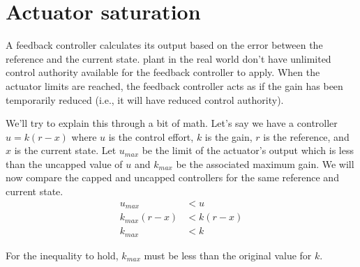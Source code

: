 \section{Actuator saturation}

A feedback controller calculates its output based on the error between the
\gls{reference} and the current \gls{state}. \Gls{plant} in the real world don't
have unlimited control authority available for the feedback controller to apply.
When the actuator limits are reached, the feedback controller acts as if the
gain has been temporarily reduced (i.e., it will have reduced control
authority).

We'll try to explain this through a bit of math. Let's say we have a controller
$u = k(r - x)$ where $u$ is the \gls{control effort}, $k$ is the gain, $r$ is
the \gls{reference}, and $x$ is the current \gls{state}. Let $u_{max}$ be the
limit of the actuator's output which is less than the uncapped value of $u$ and
$k_{max}$ be the associated maximum gain. We will now compare the capped and
uncapped controllers for the same \gls{reference} and current \gls{state}.
\begin{align*}
  u_{max} &< u \\
  k_{max}(r - x) &< k(r - x) \\
  k_{max} &< k
\end{align*}

For the inequality to hold, $k_{max}$ must be less than the original value for
$k$.
